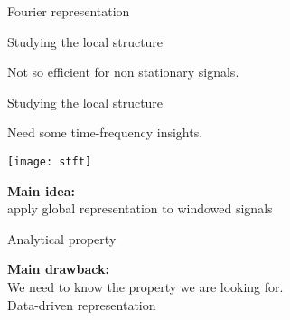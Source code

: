 \documentclass[defense.tex]{subfiles}
\begin{document}
\begin{frame}{Fourier representation}
	\begin{center}
	\end{center}
	
\end{frame}



\begin{frame}{Studying the local structure}

	\centering
	{\Large Not so efficient for non stationary signals.\\[1em]}
	\begin{center}
		
	\end{center}

\end{frame}

\begin{frame}{Studying the local structure}

	\centering
	{\Large Need some time-frequency insights.\\[1em]}
	\begin{center}
		\texttt{[image: stft]}
	\end{center}
	
	\Large {\bf Main idea:}\\
	apply global representation to windowed signals

\end{frame}



\begin{frame}{Analytical property}

	\centering \Large
	{\bf Main drawback: }\\[1em]
	We need to know the property we are looking for.\\[2em]
	
	Data-driven representation

\end{frame}
\end{document}
